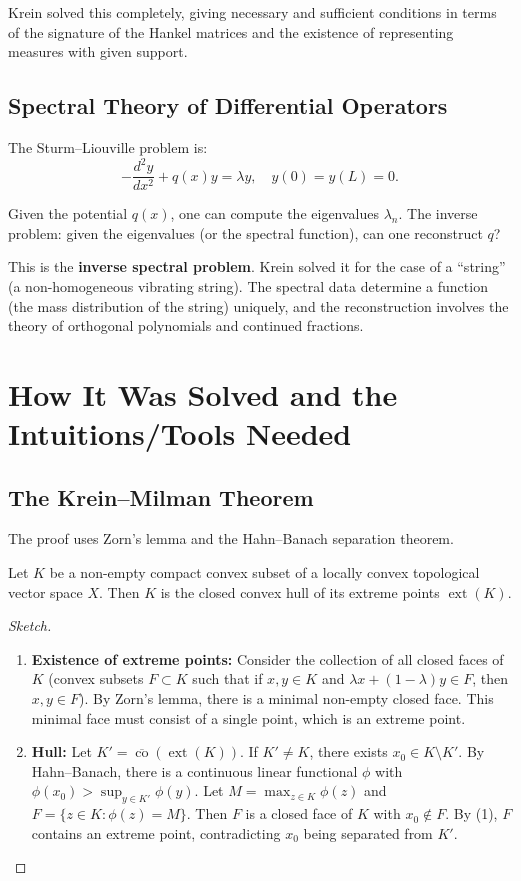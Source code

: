 Krein solved this completely, giving necessary and sufficient conditions in terms of the signature of the Hankel matrices and the existence of representing measures with given support.

\subsection{Spectral Theory of Differential Operators}

The Sturm--Liouville problem is:
\[
-\frac{d^2 y}{dx^2} + q(x) y = \lambda y, \quad y(0) = y(L) = 0.
\]

Given the potential $q(x)$, one can compute the eigenvalues $\lambda_n$. The inverse problem: given the eigenvalues (or the spectral function), can one reconstruct $q$?

This is the \textbf{inverse spectral problem}. Krein solved it for the case of a ``string'' (a non-homogeneous vibrating string). The spectral data determine a function (the mass distribution of the string) uniquely, and the reconstruction involves the theory of orthogonal polynomials and continued fractions.

\section{How It Was Solved and the Intuitions/Tools Needed}

\subsection{The Krein--Milman Theorem}

The proof uses Zorn's lemma and the Hahn--Banach separation theorem.

\begin{theorem}
Let $K$ be a non-empty compact convex subset of a locally convex topological vector space $X$. Then $K$ is the closed convex hull of its extreme points $\operatorname{ext}(K)$.
\end{theorem}

\begin{proof}[Sketch]
\begin{enumerate}
    \item \textbf{Existence of extreme points:} Consider the collection of all closed faces of $K$ (convex subsets $F \subset K$ such that if $x,y \in K$ and $\lambda x + (1-\lambda)y \in F$, then $x,y \in F$). By Zorn's lemma, there is a minimal non-empty closed face. This minimal face must consist of a single point, which is an extreme point.
    \item \textbf{Hull:} Let $K' = \overline{\operatorname{co}}(\operatorname{ext}(K))$. If $K' \neq K$, there exists $x_0 \in K \setminus K'$. By Hahn--Banach, there is a continuous linear functional $\phi$ with $\phi(x_0) > \sup_{y \in K'} \phi(y)$. Let $M = \max_{z \in K} \phi(z)$ and $F = \{z \in K : \phi(z) = M\}$. Then $F$ is a closed face of $K$ with $x_0 \notin F$. By (1), $F$ contains an extreme point, contradicting $x_0$ being separated from $K'$.
\end{enumerate}
\end{proof}

